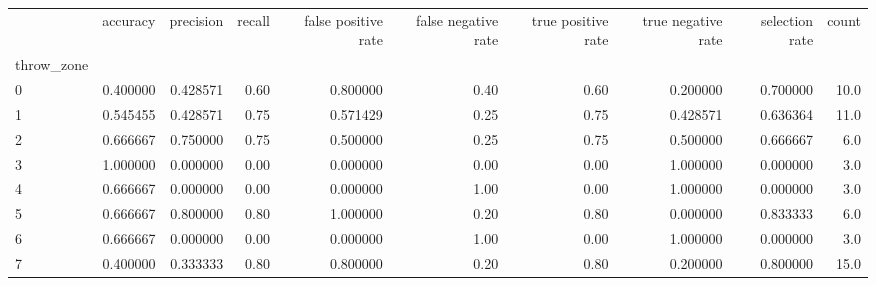 \begin{tabular}{lrrrrrrrrr}
\toprule
{} &  accuracy &  precision &  recall &  false positive rate &  false negative rate &  true positive rate &  true negative rate &  selection rate &  count \\
throw\_zone &           &            &         &                      &                      &                     &                     &                 &        \\
\midrule
0          &  0.400000 &   0.428571 &    0.60 &             0.800000 &                 0.40 &                0.60 &            0.200000 &        0.700000 &   10.0 \\
1          &  0.545455 &   0.428571 &    0.75 &             0.571429 &                 0.25 &                0.75 &            0.428571 &        0.636364 &   11.0 \\
2          &  0.666667 &   0.750000 &    0.75 &             0.500000 &                 0.25 &                0.75 &            0.500000 &        0.666667 &    6.0 \\
3          &  1.000000 &   0.000000 &    0.00 &             0.000000 &                 0.00 &                0.00 &            1.000000 &        0.000000 &    3.0 \\
4          &  0.666667 &   0.000000 &    0.00 &             0.000000 &                 1.00 &                0.00 &            1.000000 &        0.000000 &    3.0 \\
5          &  0.666667 &   0.800000 &    0.80 &             1.000000 &                 0.20 &                0.80 &            0.000000 &        0.833333 &    6.0 \\
6          &  0.666667 &   0.000000 &    0.00 &             0.000000 &                 1.00 &                0.00 &            1.000000 &        0.000000 &    3.0 \\
7          &  0.400000 &   0.333333 &    0.80 &             0.800000 &                 0.20 &                0.80 &            0.200000 &        0.800000 &   15.0 \\
\bottomrule
\end{tabular}
